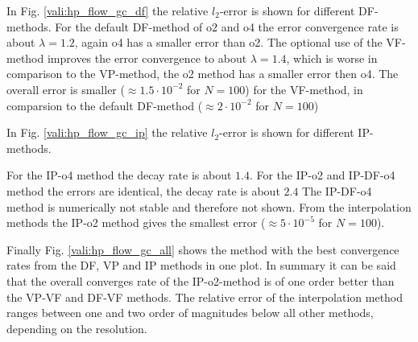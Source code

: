 In Fig. \ref{vali:hp_flow_gc_df} the relative $l_2$-error is shown for different DF-methods.
For the default DF-method of o2 and o4 the error convergence rate is about $\lambda=1.2$,
again o4 has a smaller error than o2.
The optional use of the VF-method improves the error convergence to about $\lambda=1.4$,
which is worse in comparison to the VP-method, the o2 method has a smaller error then o4.
The overall error is smaller ($\approx 1.5 \cdot 10^{-2}$ for $N=100$) for the VF-method,
in comparsion to the default DF-method ($\approx2\cdot 10^{-2}$ for $N=100$)


In Fig. \ref{vali:hp_flow_gc_ip} the relative $l_2$-error is shown for different IP-methods.


For the IP-o4 method the decay rate is about $1.4$.
For the IP-o2 and IP-DF-o4 method the errors are identical, the decay rate is about $2.4$
The IP-DF-o4 method is numerically not stable and therefore not shown.
From the interpolation methods the IP-o2 method gives the smallest error  ($\approx 5 \cdot 10^{-5}$ for $N=100$).


Finally Fig. \ref{vali:hp_flow_gc_all} shows the method  with the best convergence
rates from the DF, VP and IP methods in one plot.
In summary it can be said that the overall converges rate of the IP-o2-method is of one order better
than the VP-VF and DF-VF methods. The relative error of the interpolation method ranges
between one and two order of magnitudes below all other methods, depending on the resolution.

